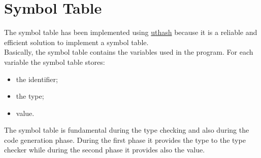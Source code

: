 \section{Symbol Table}
The symbol table has been implemented using
\href{https://troydhanson.github.io/uthash/}{uthash} because it is a reliable
and efficient solution to implement a symbol table.
\\
Basically, the symbol table contains the variables used in the program.
For each variable the symbol table stores:
\begin{itemize}
	\item the identifier;
	\item the type;
	\item value.
\end{itemize}

The symbol table is fundamental during the type checking and also during the
code generation phase. During the first phase it provides the type to the
type checker while during the second phase it provides also the value.